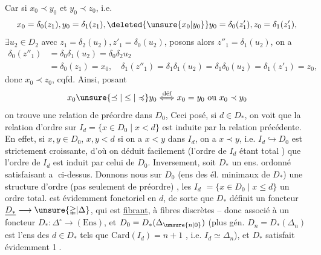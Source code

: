 Car si $x_0\prec y_0$ et $y_0\prec z_0$, i.e.
\[
x_0=\delta_0(z_1),y_0=\delta_1(z_1),\deleted{\unsure{x_0|y_0}}y_0=\delta_0(z'_1),z_0=\delta_1(z'_1),
\]
$\exists u_2\in D_2$ avec $z_1=\delta_2(u_2),z'_1=\delta_0(u_2)$, posons alors $z''_1=\delta_1(u_2)$, on a
\[
\begin{aligned}
\delta_0(z''_1)&=\delta_0\delta_1(u_2)=\delta_0\delta_2u_2\\
&=\delta_0(z_1)=x_0,\quad\delta_1(z''_1)=\delta_1\delta_1(u_2)=\delta_1\delta_0(u_2)=\delta_1(z'_1)=z_0,
\end{aligned}
\]
donc $x_0\prec z_0$, cqfd. 
Ainsi, posant
\[
x_0\unsure{\preceq|\leq|\preccurlyeq} y_0\mathrel{\overset{\text{déf}}{\Longleftrightarrow}}x_0=y_0\ \text{ou}\ x_0\prec y_0
\]
on trouve une relation de préordre dans $D_0$, 
Ceci  posé, si $d\in D_*$, on voit que la relation d'ordre sur $I_d=\{x\in D_0\mid x<d\}$ est induite par la relation précédente. En effet, si $x,y\in D_0$, $x,y<d$ si on a
$x<y$ dans  $I_d$,  on a $x\prec y$, i.e.  $I_d\hookrightarrow D_0$ est strictement croissante, d'où on déduit facilement  (l'ordre de $I_d$ étant total ) que l'ordre de $I_d$ est induit par celui de $D_0$.
Inversement, soit $D_{*}$ un ens. ordonné satisfaisant \textcircled{a} ci-dessus. Donnons nous sur $D_0$ (ens des él. minimaux de $D_*$) une structure d'ordre (pas seulement de préordre) , 
  les $I_d$  $=\{x\in D_0\mid x\leq d\}$ un ordre total.   est évidemment fonctoriel 
en $d$, de sorte que $D_*$ définit un foncteur  $\underline{D_*}\longrightarrow\unsure{\mathbb{\Delta}|\Delta}$, qui est \uline{fibrant}, à fibres discrètes -- donc associé à un foncteur $D_*:\mathbb{\Delta}^{\circ}\longrightarrow(\mathrm{Ens})$, et $D_0=D_*(\Delta_{\unsure{n|0}})$
(plus gén. $D_n=D_*(\Delta_n)$ est l'ens des $d\in D_*$ tels que $\mathrm{Card}(I_d)=n+1$ \unsure{$\}$}, i.e. $I_d\simeq\Delta_n$), et $D_*$ satisfait évidemment \textcircled{1}.

